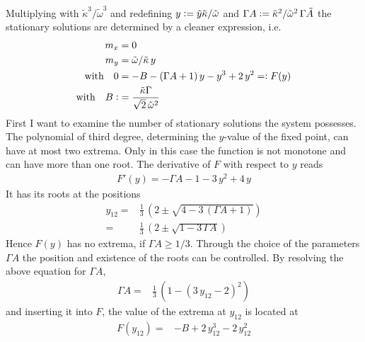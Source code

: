 Multiplying with $\tilde{\kappa}^3/\tilde{\omega}^3$ and redefining ${y}\vcentcolon=\tilde{y}\tilde{\kappa}/\tilde{\omega}$ and $\Gamma A\vcentcolon=\tilde{\kappa}^2/\tilde{\omega}^2\,\Gamma\tilde{A}$ the stationary solutions are determined by a cleaner expression, i.e.
\begin{align}
    m_x&=0\notag\\
    m_y&=\tilde{\omega}/\tilde{\kappa}\,{y}\notag\\
    \text{with}\quad0&=-B-(\Gamma A+1)\,{y}    - {y}^3+2\,{y}^2=\vcentcolon F({y})\notag\\
    \text{with}\quad B\vcentcolon&= \frac{\tilde{\kappa}\Gamma}{\sqrt{2}\,\tilde{\omega}^2}
\end{align}
First I want to examine the number of stationary solutions the system possesses. The polynomial of third degree, determining the $y$-value of the fixed point, can have at most two extrema. Only in this case the function is not monotone and can have more than one root. The derivative of $F$ with respect to $y$ reads
\begin{align*}
    F'(y)=-\Gamma A-1 -3\,y^2+4\,y
\end{align*}
It has its roots at the positions
\begin{align*}
    y_{12}=&\frac{1}{3}\,\left(  2\pm \sqrt{4-3\,(\Gamma A+1)}  \right)\\
    =&\frac{1}{3}\,\left(  2\pm \sqrt{1-3\,\Gamma A}  \right)
\end{align*}
Hence $F(y)$ has no extrema, if $\Gamma A\geq1/3$. Through the choice of the parameters $\Gamma A$ the position and existence of the roots can be controlled. By resolving the above equation for $\Gamma A$, 
\begin{align*}
    \Gamma A=& \frac{1}{3}\,\left(  1-(3\,y_{12}-2)^2 \right)
\end{align*}
and inserting it into $F$, the value of the extrema at $y_{12}$ is located at
\begin{align*}
    F(y_{12})=&%
    -B+2\,y_{12}^3-2\,y_{12}^2
\end{align*}
